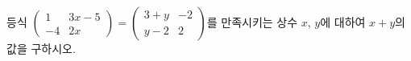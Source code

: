 \hspace*{2mm}\begin{minipage}[t]{\dimexpr\linewidth-2mm\relax}\vspace{0pt}
등식 $\begin{pmatrix} 1 & 3x-5 \\ -4 & 2x \end{pmatrix}=\begin{pmatrix} 3+y & -2 \\ y-2 & 2 \end{pmatrix}$를 만족시키는 상수 $x$, $y$에 대하여 $x+y$의 값을 구하시오.\end{minipage}
